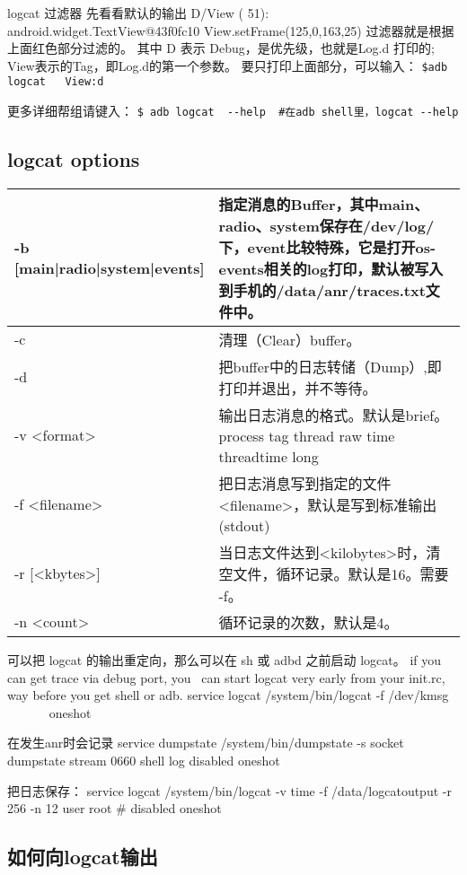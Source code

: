 \documentclass[a4paper,titlepage]{article}
\begin{document}
        logcat 过滤器
先看看默认的输出
D/View    (   51): android.widget.TextView@43f0fc10 View.setFrame(125,0,163,25) 
过滤器就是根据上面红色部分过滤的。
其中 D 表示 Debug，是优先级，也就是Log.d 打印的; View表示的Tag，即Log.d的第一个参数。
要只打印上面部分，可以输入：
\verb|$adb logcat   View:d|

更多详细帮组请键入：
\verb|$ adb logcat  --help  #在adb shell里，logcat --help   |



\subsection{logcat options}

\begin{tabular}{| p{0.45\linewidth} | p{0.55\linewidth} |}\hline
-b [main|radio|system|events] & 指定消息的Buffer，其中main、radio、system保存在/dev/log/下，event比较特殊，它是打开os-events相关的log打印，默认被写入到手机的/data/anr/traces.txt文件中。\\\hline
-c & 清理（Clear）buffer。\\\hline
-d & 把buffer中的日志转储（Dump）,即打印并退出，并不等待。\\\hline
-v <format> & 输出日志消息的格式。默认是brief。process tag thread raw time threadtime long \\\hline
-f <filename> & 把日志消息写到指定的文件<filename>，默认是写到标准输出(stdout)\\\hline
-r [<kbytes>] & 当日志文件达到<kilobytes>时，清空文件，循环记录。默认是16。需要 -f。\\\hline
-n <count> & 循环记录的次数，默认是4。\\\hline
\end{tabular}

可以把 logcat 的输出重定向，那么可以在 sh 或 adbd 之前启动 logcat。
if you can get trace via debug port, you  can start logcat very
early from your init.rc, way before you get shell or adb.
service logcat /system/bin/logcat -f /dev/kmsg
       oneshot

在发生anr时会记录
service dumpstate /system/bin/dumpstate -s
    socket dumpstate stream 0660 shell log
    disabled
    oneshot

把日志保存：
service logcat /system/bin/logcat -v time -f /data/logcatoutput -r 256 -n 12
    user root
\#    disabled
   oneshot


\subsection{如何向logcat输出}
\end{document}
